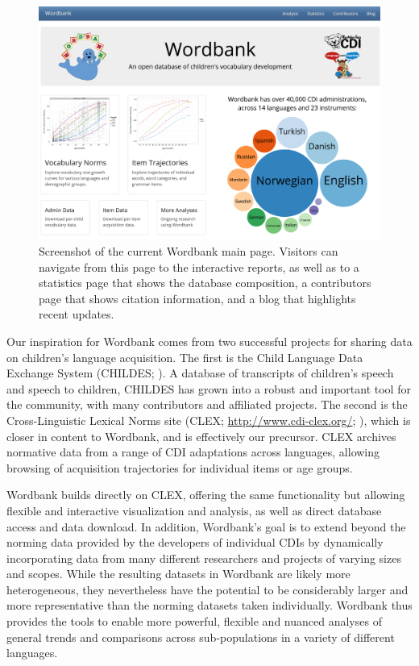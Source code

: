 \documentclass[doc,noapacite]{apa2}
\begin{document}
\begin{figure}[h!]
\includegraphics[width=6.4in]{figures/screenshot.png}
\caption{\label{fig:screenshot} Screenshot of the current Wordbank main page. Visitors can navigate from this page to the interactive reports, as well as to a statistics page that shows the database composition, a contributors page that shows citation information, and a blog that highlights recent updates.}
\end{figure}

Our inspiration for Wordbank comes from two successful projects for sharing data on children's language acquisition. The first is the Child Language Data Exchange System (CHILDES; ). A database of transcripts of children's speech and speech to children, CHILDES has grown into a robust and important tool for the community, with many contributors and affiliated projects. The second is the Cross-Linguistic Lexical Norms site (CLEX; \url{http://www.cdi-clex.org/}; ), which is closer in content to Wordbank, and is effectively our precursor. CLEX archives normative data from a range of CDI adaptations across languages, allowing browsing of acquisition trajectories for individual items or age groups. 

Wordbank builds directly on CLEX, offering the same functionality but allowing flexible and interactive visualization and analysis, as well as direct database access and data download. In addition, Wordbank's goal is to extend beyond the norming data provided by the developers of individual CDIs by dynamically incorporating data from many different researchers and projects of varying sizes and scopes.  While the resulting datasets in Wordbank are likely more heterogeneous, they nevertheless have the potential to be considerably larger and more representative than the norming datasets taken individually.  Wordbank thus provides the tools to enable more powerful, flexible and nuanced analyses of general trends and comparisons across sub-populations in a variety of different languages.
\end{document}
